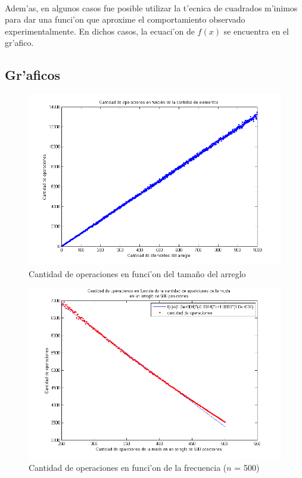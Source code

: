 \paragraph{}
Adem'as, en algunos casos fue posible utilizar la t'ecnica de cuadrados m'inimos para dar una funci'on 
que aproxime el comportamiento observado experimentalmente. En dichos casos, la ecuaci'on de $f(x)$ se encuentra en el gr'afico.

\subsection{Gr'aficos}

\begin{figure}[H]
\centering
\includegraphics[scale=0.8]{../../codigo/ejercicio3/benchmark/graficos/corridas_aleatorias_n_creciente/grafico.png}
\caption{Cantidad de operaciones en funci'on del tama\~{n}o del arreglo}
\label{Ej3fig1}
\end{figure}

\begin{figure}[H]
\centering
\includegraphics[scale=0.8]{../../codigo/ejercicio3/benchmark/graficos/frecuencia/frecuencia.png}
\caption{Cantidad de operaciones en funci'on de la frecuencia ($n$ = 500)}
\label{Ej3fig2}
\end{figure}

